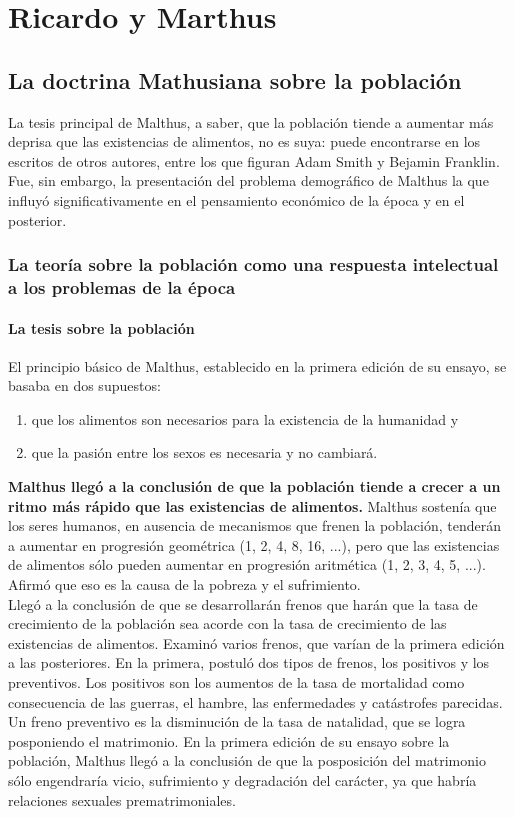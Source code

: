 \documentclass[10pt]{book}
\begin{document}
\chapter{Ricardo y Marthus}

\section*{La doctrina Mathusiana sobre la población}
La tesis principal de Malthus, a saber, que la población tiende a aumentar más deprisa que las existencias de alimentos, no es suya: puede encontrarse en los escritos de otros autores, entre los que figuran Adam Smith y Bejamin Franklin. Fue, sin embargo, la presentación del problema demográfico de Malthus la que influyó significativamente en el pensamiento económico de la época y en el posterior.

\subsection*{La teoría sobre la población como una respuesta intelectual a los problemas de la época}
\subsubsection*{La tesis sobre la población}
El principio básico de Malthus, establecido en la primera edición de su ensayo, se basaba en dos supuestos:
\begin{enumerate}[\bfseries (1)]
    \item que los alimentos son necesarios para la existencia de la
humanidad y
    \item que la pasión entre los sexos es necesaria y no cambiará. 
\end{enumerate}
\textbf{Malthus llegó a la conclusión de que la población tiende a crecer a un ritmo más rápido que las existencias de alimentos.} Malthus sostenía que los seres humanos, en ausencia de mecanismos que frenen la población, tenderán a aumentar en progresión geométrica (1, 2, 4, 8, 16, ...), pero que las existencias de alimentos sólo pueden aumentar en progresión aritmética (1, 2, 3, 4, 5, ...). Afirmó que eso es la causa de la pobreza y el sufrimiento.\\ 
Llegó a la conclusión de que se desarrollarán frenos que harán que la tasa de crecimiento de la población sea acorde con la tasa de crecimiento de las existencias de alimentos. Examinó varios frenos, que varían de la primera edición a las posteriores. En la primera, postuló dos tipos de frenos, los positivos y los preventivos. Los positivos son los aumentos de la tasa de mortalidad como consecuencia de las guerras, el hambre, las enfermedades y catástrofes parecidas. Un freno preventivo es la disminución de la tasa de natalidad, que se logra posponiendo el matrimonio. En la primera edición de su ensayo sobre la población, Malthus llegó a la conclusión de que la posposición del matrimonio sólo engendraría vicio, sufrimiento y degradación del carácter, ya que habría relaciones sexuales prematrimoniales.\\
\end{document}
